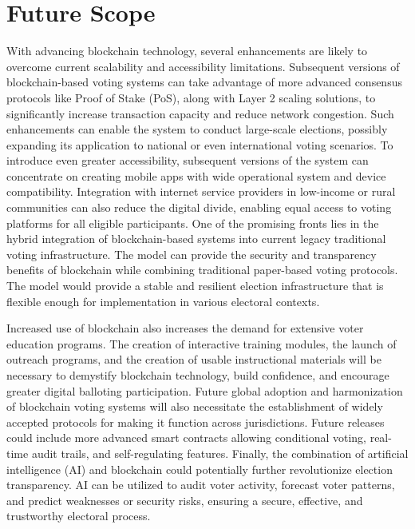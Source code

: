 \documentclass[conference]{IEEEtran}
\begin{document}
\section{Future Scope} With advancing blockchain technology, several enhancements are likely to overcome current scalability and accessibility limitations. Subsequent versions of blockchain-based voting systems can take advantage of more advanced consensus protocols like Proof of Stake (PoS), along with Layer 2 scaling solutions, to significantly increase transaction capacity and reduce network congestion. Such enhancements can enable the system to conduct large-scale elections, possibly expanding its application to national or even international voting scenarios. To introduce even greater accessibility, subsequent versions of the system can concentrate on creating mobile apps with wide operational system and device compatibility. Integration with internet service providers in low-income or rural communities can also reduce the digital divide, enabling equal access to voting platforms for all eligible participants. One of the promising fronts lies in the hybrid integration of blockchain-based systems into current legacy traditional voting infrastructure. The model can provide the security and transparency benefits of blockchain while combining traditional paper-based voting protocols. The model would provide a stable and resilient election infrastructure that is flexible enough for implementation in various electoral contexts.

Increased use of blockchain also increases the demand for extensive voter education programs. The creation of interactive training modules, the launch of outreach programs, and the creation of usable instructional materials will be necessary to demystify blockchain technology, build confidence, and encourage greater digital balloting participation. Future global adoption and harmonization of blockchain voting systems will also necessitate the establishment of widely accepted protocols for making it function across jurisdictions. Future releases could include more advanced smart contracts allowing conditional voting, real-time audit trails, and self-regulating features. Finally, the combination of artificial intelligence (AI) and blockchain could potentially further revolutionize election transparency. AI can be utilized to audit voter activity, forecast voter patterns, and predict weaknesses or security risks, ensuring a secure, effective, and trustworthy electoral process.
\end{document}
